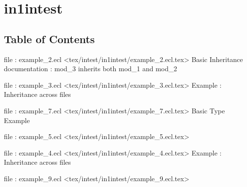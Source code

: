 \chapter*{in1intest}


\section*{Table of Contents}
\par
file : example\_2.ecl <tex/intest/in1intest/example\_2.ecl.tex>  Basic Inheritance documentation : mod\_3 inherits both mod\_1 and mod\_2

\par
file : example\_3.ecl <tex/intest/in1intest/example\_3.ecl.tex>  Example : Inheritance across files

\par
file : example\_7.ecl <tex/intest/in1intest/example\_7.ecl.tex>  Basic Type Example

\par
file : example\_5.ecl <tex/intest/in1intest/example\_5.ecl.tex>  

\par
file : example\_4.ecl <tex/intest/in1intest/example\_4.ecl.tex>  Example : Inheritance across files

\par
file : example\_9.ecl <tex/intest/in1intest/example\_9.ecl.tex>  








